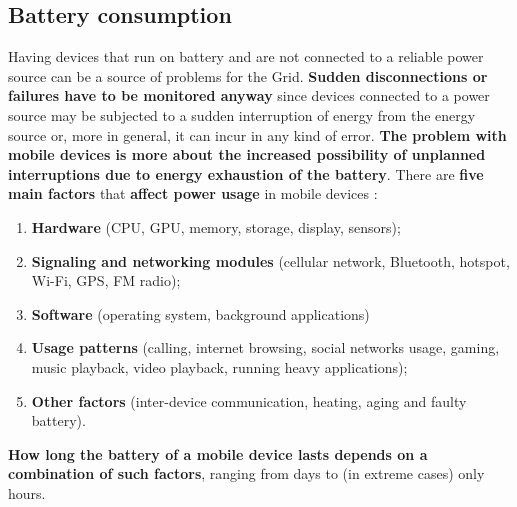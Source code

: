\subsection{Battery consumption}
Having devices that run on battery and are not connected to a reliable power source can be a source of problems for the Grid. \textbf{Sudden disconnections or failures have to be monitored anyway} since devices connected to a power source may be subjected to a sudden interruption of energy from the energy source or, more in general, it can incur in any kind of error. \textbf{The problem with mobile devices is more about the increased possibility of unplanned interruptions due to energy exhaustion of the battery}.
There are \textbf{five main factors} that \textbf{affect power usage} in mobile devices \cite{mobile_power_consumption}:
\begin{enumerate}
    \item \textbf{Hardware} (CPU, GPU, memory, storage, display, sensors);
    \item \textbf{Signaling and networking modules} (cellular network, Bluetooth, hotspot, Wi-Fi, GPS, FM radio);
    \item \textbf{Software} (operating system, background applications)
    \item \textbf{Usage patterns} (calling, internet browsing, social networks usage, gaming, music playback, video playback, running heavy applications);
    \item \textbf{Other factors} (inter-device communication, heating, aging and faulty battery).
\end{enumerate}
\textbf{How long the battery of a mobile device lasts depends on a combination of such factors}, ranging from days to (in extreme cases) only hours.

